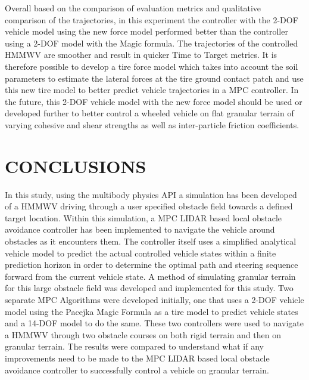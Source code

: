 \documentclass[12pt,onecolumn]{report}
\newcommand{\CHRONO}{{\sffamily{{Chrono}}}}
\begin{document}
Overall based on the comparison of evaluation metrics and qualitative comparison of the trajectories, in this experiment the controller with the 2-DOF vehicle model using the new force model performed better than the controller using a 2-DOF model with the Magic formula. The trajectories of the controlled HMMWV are smoother and result in quicker Time to Target metrics. It is therefore possible to develop a tire force model which takes into account the soil parameters to estimate the lateral forces at the tire ground contact patch and use this new tire model to better predict vehicle trajectories in a MPC controller. In the future, this 2-DOF vehicle model with the new force model should be used or developed further to better control a wheeled vehicle on flat granular terrain of varying cohesive and shear strengths as well as inter-particle friction coefficients. 


\chapter{CONCLUSIONS}\label{c:conclusion}

In this study, using the multibody physics API {\CHRONO} a simulation has been developed of a HMMWV driving through a user specified obstacle field towards a defined target location. Within this simulation, a MPC LIDAR based local obstacle avoidance controller has been implemented to navigate the vehicle around obstacles as it encounters them. The controller itself uses a simplified analytical vehicle model to predict the actual controlled {\CHRONO} vehicle states within a finite prediction horizon in order to determine the optimal path and steering sequence forward from the current vehicle state. A method of simulating granular terrain for this large obstacle field was developed and implemented for this study. Two separate MPC Algorithms were developed initially, one that uses a 2-DOF vehicle model using the Pacejka Magic Formula as a tire model to predict {\CHRONO} vehicle states and a 14-DOF model to do the same. These two controllers were used to navigate a {\CHRONO} HMMWV through two obstacle courses on both rigid terrain and then on granular terrain. The results were compared to understand what if any improvements need to be made to the MPC LIDAR based local obstacle avoidance controller to successfully control a vehicle on granular terrain. 
\end{document}

